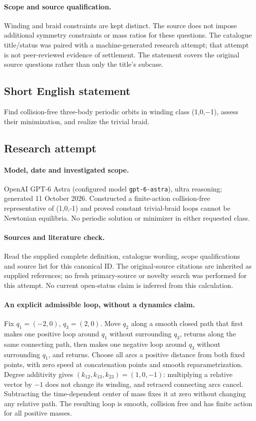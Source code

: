 \documentclass[11pt]{article}
\begin{document}
\paragraph{Scope and source qualification.}Winding and braid constraints are kept distinct. The source does not impose additional symmetry constraints or mass ratios for these questions. The catalogue title/status was paired with a machine-generated research attempt; that attempt is not peer-reviewed evidence of settlement. The statement covers the original source questions rather than only the title’s subcase.
\subsection{Short English statement}
Find collision-free three-body periodic orbits in winding class (1,0,−1), assess their minimization, and realize the trivial braid.
\subsection{Research attempt}
\paragraph{Model, date and investigated scope.}
OpenAI GPT-6 Astra (configured model \texttt{gpt-6-astra}), ultra reasoning; generated 11 October 2026. Constructed a finite-action collision-free representative of (1,0,-1) and proved constant trivial-braid loops cannot be Newtonian equilibria. No periodic solution or minimizer in either requested class.

\paragraph{Sources and literature check.}
Read the supplied complete definition, catalogue wording, scope qualifications and source list for this canonical ID. The original-source citations are inherited as supplied references; no fresh primary-source or novelty search was performed for this attempt. No current open-status claim is inferred from this calculation.

\paragraph{An explicit admissible loop, without a dynamics claim.}Fix \(q_1=(-2,0)\), \(q_3=(2,0)\). Move \(q_2\) along a smooth closed path that first makes one positive loop around \(q_1\) without surrounding \(q_3\), returns along the same connecting path, then makes one negative loop around \(q_3\) without surrounding \(q_1\), and returns. Choose all arcs a positive distance from both fixed points, with zero speed at concatenation points and smooth reparametrization. Degree additivity gives \((k_{12},k_{13},k_{23})=(1,0,-1)\): multiplying a relative vector by \(-1\) does not change its winding, and retraced connecting arcs cancel. Subtracting the time-dependent center of mass fixes it at zero without changing any relative path. The resulting loop is smooth, collision free and has finite action for all positive masses.
\end{document}
